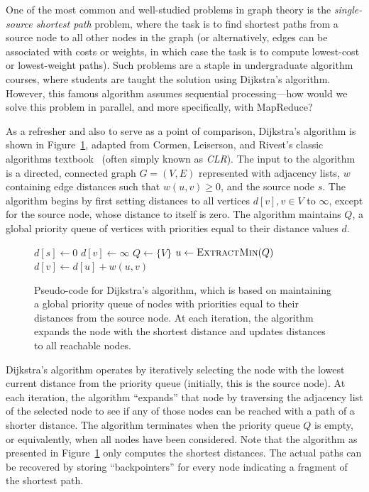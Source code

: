 One of the most common and well-studied problems in graph theory is
the {\it single-source shortest path} problem, where the task is to
find shortest paths from a source node to all other nodes in the graph
(or alternatively, edges can be associated with costs or weights, in
which case the task is to compute lowest-cost or lowest-weight paths).
Such problems are a staple in undergraduate algorithm courses, where
students are taught the solution using Dijkstra's algorithm.  However,
this famous algorithm assumes sequential processing---how would we
solve this problem in parallel, and more specifically, with MapReduce?

As a refresher and also to serve as a point of comparison, Dijkstra's
algorithm is shown in Figure~\ref{figure:chapter-graphs:Dijkstra},
adapted from Cormen, Leiserson, and Rivest's classic algorithms
textbook~\cite{CLR} (often simply known as {\it CLR}).  The input to
the algorithm is a directed, connected graph $G=(V,E)$ represented
with adjacency lists, $w$ containing edge distances such that $w(u,v)
\geq 0$, and the source node $s$.  The algorithm begins by first
setting distances to all vertices $d[v], v \in V$ to $\infty$, except
for the source node, whose distance to itself is zero.  The algorithm
maintains $Q$, a global priority queue of vertices with priorities equal to
their distance values $d$.

\begin{figure}[t]
\algrenewcommand\algorithmicfunction{}
  \begin{algorithmic}[1]
    \State $d[s] \gets 0$
      \State $d[v] \gets \infty$
    \EndFor
    \State $Q \gets \{V\}$
      \State $u \gets \textsc{ExtractMin}(Q)$
          \State $d[v] \gets d[u] + w(u,v)$
        \EndIf
      \EndFor
    \EndWhile
    \EndFunction
  \end{algorithmic}
  \caption{Pseudo-code for Dijkstra's algorithm, which is based on
    maintaining a global priority queue of nodes with priorities equal to
    their distances from the source node.  At each iteration, the
    algorithm expands the node with the shortest distance and updates
    distances to all reachable nodes.}
\label{figure:chapter-graphs:Dijkstra}
\end{figure}

Dijkstra's algorithm operates by iteratively selecting the node with
the lowest current distance from the priority queue (initially, this
is the source node).  At each iteration, the algorithm ``expands''
that node by traversing the adjacency list of the selected node to see
if any of those nodes can be reached with a path of a shorter
distance.  The algorithm terminates when the priority queue $Q$ is
empty, or equivalently, when all nodes have been considered.  Note
that the algorithm as presented in
Figure~\ref{figure:chapter-graphs:Dijkstra} only computes the shortest
distances.  The actual paths can be recovered by storing
``backpointers'' for every node indicating a fragment of the shortest
path.

